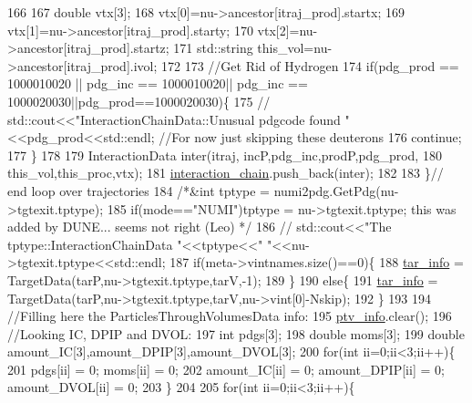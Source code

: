 \begin{DoxyCode}
166       
167       \textcolor{keywordtype}{double} vtx[3];
168       vtx[0]=nu->ancestor[itraj\_prod].startx;
169       vtx[1]=nu->ancestor[itraj\_prod].starty;
170       vtx[2]=nu->ancestor[itraj\_prod].startz;
171       std::string this\_vol=nu->ancestor[itraj\_prod].ivol;
172       
173       \textcolor{comment}{//Get Rid of Hydrogen}
174         \textcolor{keywordflow}{if}(pdg\_prod == 1000010020 || pdg\_inc == 1000010020|| pdg\_inc == 1000020030||pdg\_prod==1000020030)\{
175       \textcolor{comment}{// std::cout<<"InteractionChainData::Unusual pdgcode found "<<pdg\_prod<<std::endl; //For now just
       skipping these deuterons}
176         \textcolor{keywordflow}{continue};
177         \}
178       
179       InteractionData inter(itraj, incP,pdg\_inc,prodP,pdg\_prod,
180                             this\_vol,this\_proc,vtx);   
181       \hyperlink{class_neutrino_flux_reweight_1_1_interaction_chain_data_a5864063b9c20b4f70e4f1e355df21963}{interaction\_chain}.push\_back(inter);
182 
183     \}\textcolor{comment}{// end loop over trajectories}
184     \textcolor{comment}{/*&int tptype = numi2pdg.GetPdg(nu->tgtexit.tptype);}
185 \textcolor{comment}{    if(mode=="NUMI")tptype = nu->tgtexit.tptype; this was added by DUNE... seems not right (Leo) */}
186       \textcolor{comment}{//  std::cout<<"The tptype::InteractionChainData "<<tptype<<" "<<nu->tgtexit.tptype<<std::endl;}
187     \textcolor{keywordflow}{if}(meta->vintnames.size()==0)\{
188       \hyperlink{class_neutrino_flux_reweight_1_1_interaction_chain_data_a6df89bff97001a4988487fcfb9f4acea}{tar\_info} = TargetData(tarP,nu->tgtexit.tptype,tarV,-1);
189     \}
190     \textcolor{keywordflow}{else}\{    
191       \hyperlink{class_neutrino_flux_reweight_1_1_interaction_chain_data_a6df89bff97001a4988487fcfb9f4acea}{tar\_info} = TargetData(tarP,nu->tgtexit.tptype,tarV,nu->vint[0]-Nskip);
192     \}
193     
194     \textcolor{comment}{//Filling here the ParticlesThroughVolumesData info:}
195     \hyperlink{class_neutrino_flux_reweight_1_1_interaction_chain_data_adda6bc8863579964b62e3d4f51e14926}{ptv\_info}.clear();
196     \textcolor{comment}{//Looking IC, DPIP and DVOL:}
197     \textcolor{keywordtype}{int} pdgs[3];
198     \textcolor{keywordtype}{double} moms[3];
199     \textcolor{keywordtype}{double} amount\_IC[3],amount\_DPIP[3],amount\_DVOL[3];
200     \textcolor{keywordflow}{for}(\textcolor{keywordtype}{int} ii=0;ii<3;ii++)\{
201       pdgs[ii] = 0; moms[ii] = 0; 
202       amount\_IC[ii] = 0; amount\_DPIP[ii] = 0; amount\_DVOL[ii] = 0;
203     \}
204     
205     \textcolor{keywordflow}{for}(\textcolor{keywordtype}{int} ii=0;ii<3;ii++)\{

\end{DoxyCode}

